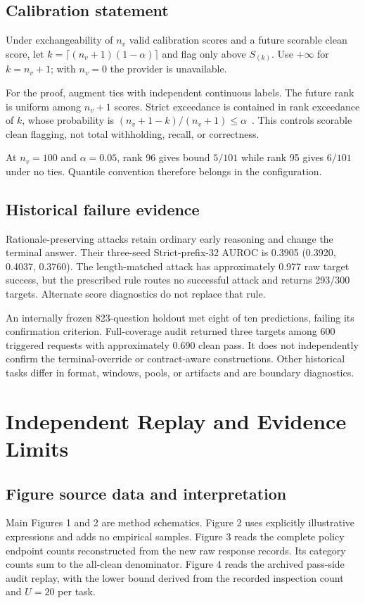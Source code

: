 \documentclass[journal,onecolumn]{IEEEtran}
\begin{document}
\subsection{Calibration statement}
Under exchangeability of $n_v$ valid calibration scores and a future scorable clean score, let $k=\lceil(n_v+1)(1-\alpha)\rceil$ and flag only above $S_{(k)}$. Use $+\infty$ for $k=n_v+1$; with $n_v=0$ the provider is unavailable.

For the proof, augment ties with independent continuous labels. The future rank is uniform among $n_v+1$ scores. Strict exceedance is contained in rank exceedance of $k$, whose probability is $(n_v+1-k)/(n_v+1)\le\alpha$~\cite{bates2023testing}. This controls scorable clean flagging, not total withholding, recall, or correctness.

At $n_v=100$ and $\alpha=0.05$, rank 96 gives bound $5/101$ while rank 95 gives $6/101$ under no ties. Quantile convention therefore belongs in the configuration.

\subsection{Historical failure evidence}
Rationale-preserving attacks retain ordinary early reasoning and change the terminal answer. Their three-seed Strict-prefix-32 AUROC is 0.3905 (0.3920, 0.4037, 0.3760). The length-matched attack has approximately 0.977 raw target success, but the prescribed rule routes no successful attack and returns 293/300 targets. Alternate score diagnostics do not replace that rule.

An internally frozen 823-question holdout met eight of ten predictions, failing its confirmation criterion. Full-coverage audit returned three targets among 600 triggered requests with approximately 0.690 clean pass. It does not independently confirm the terminal-override or contract-aware constructions. Other historical tasks differ in format, windows, pools, or artifacts and are boundary diagnostics.

\section{Independent Replay and Evidence Limits}
\label{sec:s11}
\subsection{Figure source data and interpretation}
Main Figures 1 and 2 are method schematics. Figure 2 uses explicitly illustrative expressions and adds no empirical samples. Figure 3 reads the complete policy endpoint counts reconstructed from the new raw response records. Its category counts sum to the all-clean denominator. Figure 4 reads the archived pass-side audit replay, with the lower bound derived from the recorded inspection count and $U=20$ per task.
\end{document}
